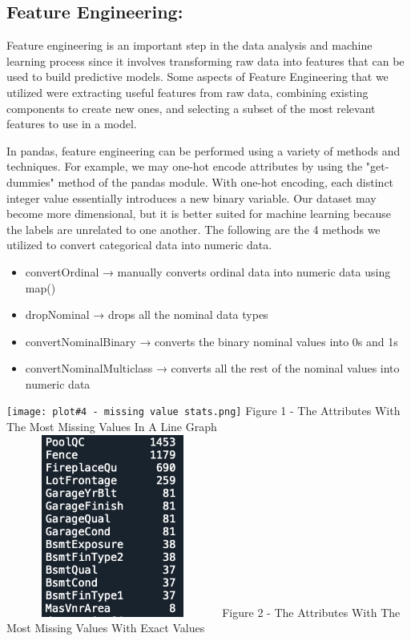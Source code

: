 \documentclass[10pt,twocolumn,letterpaper]{article}
\begin{document}
\subsection{Feature Engineering:}
Feature engineering is an important step in the data analysis and machine learning process since it involves transforming raw data into features that can be used to build predictive models. Some aspects of Feature Engineering that we utilized were extracting useful features from raw data, combining existing components to create new ones, and selecting a subset of the most relevant features to use in a model.

In pandas, feature engineering can be performed using a variety of methods and techniques. For example, we may one-hot encode attributes by using the "get-dummies" method of the pandas module. With one-hot encoding, each distinct integer value essentially introduces a new binary variable. Our dataset may become more dimensional, but it is better suited for machine learning because the labels are unrelated to one another. The following are the 4 methods we utilized to convert categorical data into numeric data.
\begin{itemize}
    \item convertOrdinal → manually converts ordinal data into numeric data using map()
    \item dropNominal → drops all the nominal data types
    \item convertNominalBinary → converts the binary nominal values into 0s and 1s
    \item convertNominalMulticlass → converts all the rest of the nominal values into numeric data
\end{itemize}

\texttt{[image: plot\#4 - missing value stats.png]}
Figure 1 - The Attributes With The Most Missing Values In A Line Graph
\includegraphics[width=7cm,height=6cm]{Screen Shot 2022-12-15 at 6.15.02 AM.png}
Figure 2 - The Attributes With The Most Missing Values With Exact Values
\end{document}
